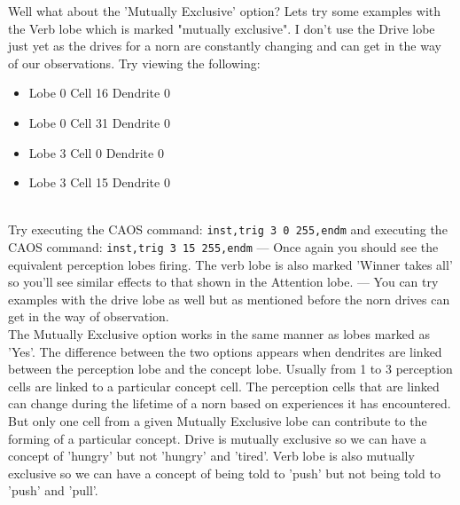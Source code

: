 \documentclass[11pt,twoside,a4paper]{article}
\begin{document}
Well what about the 'Mutually Exclusive' option? Lets try some examples with the Verb lobe which is marked "mutually exclusive". I don't use the Drive lobe just yet as the drives for a norn are constantly changing and can get in the way of our observations. Try viewing the following: %
\begin{itemize}
	\item Lobe 0 Cell 16 Dendrite 0
	\item Lobe 0 Cell 31 Dendrite 0
	\item Lobe 3 Cell 0 Dendrite 0
	\item Lobe 3 Cell 15 Dendrite 0
\end{itemize} ~\\

Try executing the CAOS command: \texttt{inst,trig 3 0 255,endm} and executing the CAOS command: \texttt{inst,trig 3 15 255,endm} --- Once again you should see the equivalent perception lobes firing. The verb lobe is also marked 'Winner takes all' so you'll see similar effects to that shown in the Attention lobe. --- You can try examples with the drive lobe as well but as mentioned before the norn drives can get in the way of observation. ~\\

The Mutually Exclusive option works in the same manner as lobes marked as 'Yes'. The difference between the two options appears when dendrites are linked between the perception lobe and the concept lobe. Usually from 1 to 3 perception cells are linked to a particular concept cell. The perception cells that are linked can change during the lifetime of a norn based on experiences it has encountered. But only one cell from a given Mutually Exclusive lobe can contribute to the forming of a particular concept. Drive is mutually exclusive so we can have a concept of 'hungry' but not 'hungry' and 'tired'. Verb lobe is also mutually exclusive so we can have a concept of being told to 'push' but not being told to 'push' and 'pull'. ~\\


\end{document}
